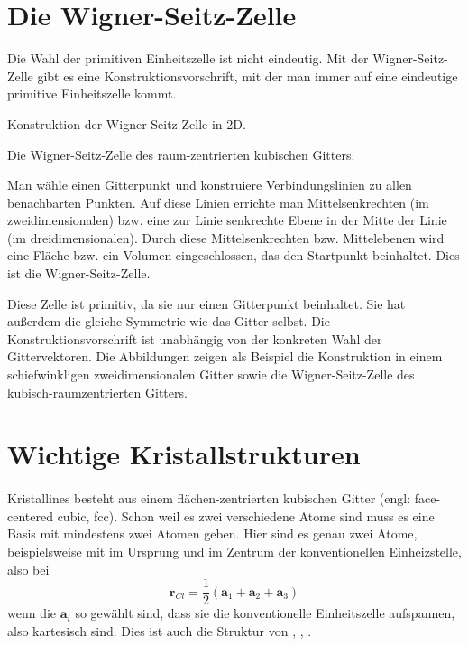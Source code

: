\section{Die Wigner-Seitz-Zelle}

Die Wahl der primitiven Einheitszelle ist nicht eindeutig. Mit der Wigner-Seitz-Zelle gibt es eine Konstruktionsvorschrift, mit der man immer auf eine eindeutige primitive Einheitszelle kommt.



\begin{marginfigure}

\caption{Konstruktion der Wigner-Seitz-Zelle in 2D.}
\end{marginfigure}

\begin{marginfigure}

\caption{Die Wigner-Seitz-Zelle des raum-zentrierten kubischen Gitters.}
\end{marginfigure}

Man wähle einen Gitterpunkt und konstruiere Verbindungslinien zu allen benachbarten Punkten. Auf diese Linien errichte man Mittelsenkrechten (im zweidimensionalen) bzw. eine zur Linie senkrechte Ebene in der Mitte der Linie (im dreidimensionalen). Durch diese Mittelsenkrechten bzw. Mittelebenen wird eine Fläche bzw. ein Volumen eingeschlossen, das den Startpunkt beinhaltet. Dies ist die Wigner-Seitz-Zelle.

Diese Zelle ist primitiv, da sie nur einen Gitterpunkt beinhaltet. Sie hat außerdem die gleiche Symmetrie wie das Gitter selbst. Die Konstruktionsvorschrift ist unabhängig von der konkreten Wahl der Gittervektoren. Die Abbildungen zeigen als Beispiel die Konstruktion in einem schiefwinkligen zweidimensionalen Gitter sowie die Wigner-Seitz-Zelle des kubisch-raumzentrierten Gitters.


\section{Wichtige Kristallstrukturen}


\paragraph{}
Kristallines  besteht aus einem flächen-zentrierten kubischen Gitter (engl: face-centered cubic, fcc). Schon weil es zwei verschiedene Atome sind muss es eine Basis mit mindestens zwei Atomen geben. Hier sind es genau zwei Atome,  beispielsweise mit  im Ursprung und  im Zentrum der konventionellen Einheizstelle, also bei
\begin{equation}
 \mathbf{r}_{Cl} = \frac{1}{2} \left(\mathbf{a}_1 + \mathbf{a}_2 +  \mathbf{a}_3  \right)
\end{equation}
wenn die $\mathbf{a}_i$ so gewählt sind, dass sie die konventionelle Einheitszelle aufspannen, also kartesisch sind. Dies ist auch die Struktur von , , .



